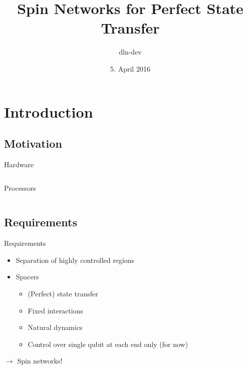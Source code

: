 \documentclass{beamer}
\begin{document}
\title{Spin Networks for Perfect State Transfer}
\author{dln-dev}
\date{5. April 2016}

\frame{\titlepage}

\section{Introduction}
\subsection{Motivation}
\begin{frame}{Hardware}
	\begin{columns}[T]
		\begin{column}{0.33\textwidth}
			\centering
   			Processors
		\end{column}
	\end{columns}
\end{frame}

\subsection{Requirements}
\begin{frame}{Requirements}
	\begin{itemize}
		\item Separation of highly controlled regions
		\item Spacers
		\begin{itemize}
			\item (Perfect) state transfer
			\item Fixed interactions
			\item Natural dynamics
			\item Control over single qubit at each end only (for now)
		\end{itemize}
	\end{itemize}
	
	$\rightarrow$ Spin networks!
\end{frame}
\end{document}
